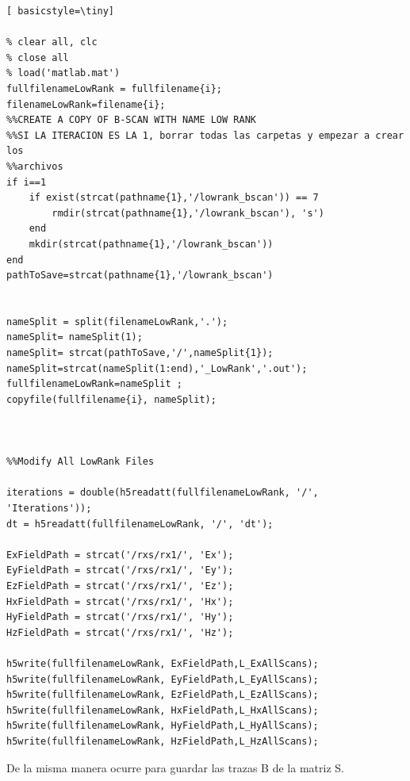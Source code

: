 \begin{lstlisting}[ basicstyle=\tiny]

% clear all, clc
% close all
% load('matlab.mat')
fullfilenameLowRank = fullfilename{i};
filenameLowRank=filename{i};
%%CREATE A COPY OF B-SCAN WITH NAME LOW RANK
%%SI LA ITERACION ES LA 1, borrar todas las carpetas y empezar a crear los
%%archivos
if i==1
    if exist(strcat(pathname{1},'/lowrank_bscan')) == 7
        rmdir(strcat(pathname{1},'/lowrank_bscan'), 's')
    end
    mkdir(strcat(pathname{1},'/lowrank_bscan'))
end
pathToSave=strcat(pathname{1},'/lowrank_bscan')


nameSplit = split(filenameLowRank,'.');
nameSplit= nameSplit(1);
nameSplit= strcat(pathToSave,'/',nameSplit{1});
nameSplit=strcat(nameSplit(1:end),'_LowRank','.out');
fullfilenameLowRank=nameSplit ;
copyfile(fullfilename{i}, nameSplit);



%%Modify All LowRank Files

iterations = double(h5readatt(fullfilenameLowRank, '/', 'Iterations'));
dt = h5readatt(fullfilenameLowRank, '/', 'dt');

ExFieldPath = strcat('/rxs/rx1/', 'Ex');
EyFieldPath = strcat('/rxs/rx1/', 'Ey');
EzFieldPath = strcat('/rxs/rx1/', 'Ez');
HxFieldPath = strcat('/rxs/rx1/', 'Hx');
HyFieldPath = strcat('/rxs/rx1/', 'Hy');
HzFieldPath = strcat('/rxs/rx1/', 'Hz');

h5write(fullfilenameLowRank, ExFieldPath,L_ExAllScans);
h5write(fullfilenameLowRank, EyFieldPath,L_EyAllScans);
h5write(fullfilenameLowRank, EzFieldPath,L_EzAllScans);
h5write(fullfilenameLowRank, HxFieldPath,L_HxAllScans);
h5write(fullfilenameLowRank, HyFieldPath,L_HyAllScans);
h5write(fullfilenameLowRank, HzFieldPath,L_HzAllScans);
\end{lstlisting}

De la misma manera ocurre para guardar las trazas B de la matriz S.


